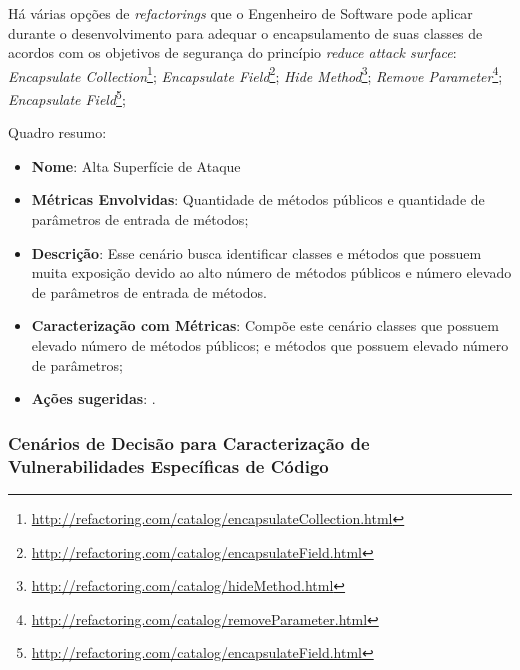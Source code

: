 %

Há várias opções de \emph{refactorings} que o Engenheiro de Software pode aplicar durante o desenvolvimento para adequar o encapsulamento de suas classes de acordos com os objetivos de segurança do princípio \emph{reduce attack surface}: \emph{Encapsulate Collection}\footnote{\url{http://refactoring.com/catalog/encapsulateCollection.html}}; \emph{Encapsulate Field}\footnote{\url{http://refactoring.com/catalog/encapsulateField.html}}; \emph{Hide Method}\footnote{\url{http://refactoring.com/catalog/hideMethod.html}}; \emph{Remove Parameter}\footnote{\url{http://refactoring.com/catalog/removeParameter.html}}; \emph{Encapsulate Field}\footnote{\url{http://refactoring.com/catalog/encapsulateField.html}};


Quadro resumo:

\begin{itemize}
\item \textbf{Nome}: Alta Superfície de Ataque
\item \textbf{Métricas Envolvidas}: Quantidade de métodos públicos e quantidade de parâmetros de entrada de métodos;
\item \textbf{Descrição}: Esse cenário busca identificar classes e métodos que possuem muita exposição devido ao alto número de métodos públicos e número elevado de parâmetros de entrada de métodos.
\item \textbf{Caracterização com Métricas}: Compõe este cenário classes que possuem elevado número de métodos públicos; e métodos que possuem elevado número de parâmetros;
\item \textbf{Ações sugeridas}: .
\end{itemize}

%

\subsubsection{Cenários de Decisão para Caracterização de Vulnerabilidades Específicas de Código}

%





